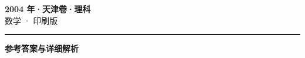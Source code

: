 \documentclass[zihao=5, a4paper]{ctexart}
\begin{document}
\begin{center}
  {\Large\bfseries 2004 年·天津卷·理科}\\[4pt]
  {\large 数学 · 印刷版}
\end{center}
\medskip
{}

\par\bigskip\hrule\bigskip
{}
\begin{center}{\large\bfseries 参考答案与详细解析}\end{center}
\smallskip

\end{document}
